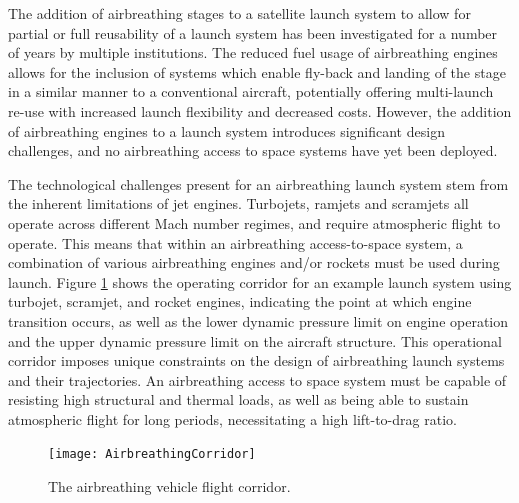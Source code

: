     The addition of airbreathing stages to a satellite launch system to allow for partial or full reusability of a launch system has been investigated for a number of years by multiple institutions\cite{Powell1991,Wilhite1991,Varvill2008,Tsuchiya2005,Mehta2001,Preller2017b,Trefny1999,Roche2000,Young2006,Bradford2000,Gong2014}. The reduced fuel usage of airbreathing engines allows for the inclusion of systems which enable fly-back and landing of the stage in a similar manner to a conventional aircraft, potentially offering multi-launch re-use with increased launch flexibility and decreased costs\cite{Preller2017b}. However, the addition of airbreathing engines to a launch system introduces significant design challenges, and 
    no airbreathing access to space systems have yet been deployed. 
    
    The technological challenges present for an airbreathing launch system stem from the inherent limitations of jet engines. Turbojets, ramjets and scramjets all operate across different Mach number regimes, and require atmospheric flight to operate\cite{Smart2009}. 
    This means that within an airbreathing access-to-space system, a combination of various airbreathing engines and/or rockets must be used during launch.
    Figure \ref{fig:AirbreathingCorridor} shows the operating corridor for an example launch system using turbojet, scramjet, and rocket engines, indicating the point at which engine transition occurs, as well as the lower dynamic pressure limit on engine operation and the upper dynamic pressure limit on the aircraft structure.
    This operational corridor imposes unique constraints on the design of airbreathing launch systems and their trajectories. An airbreathing access to space system must be capable of resisting high structural and thermal loads, as well as being able to sustain atmospheric flight for long periods, necessitating a high lift-to-drag ratio. 
    \begin{figure}[ht]
    	\centering
    	\texttt{[image: AirbreathingCorridor]}
    	\caption{The airbreathing vehicle flight corridor\cite{Smart2010}.}
    	\label{fig:AirbreathingCorridor}
    \end{figure}
    

    
    
